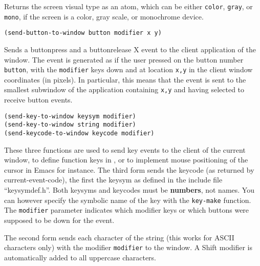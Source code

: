 

Returns the screen visual type as an atom, which can be either \verb"color",
\verb"gray", or \verb"mono", if the screen is a color, gray scale, or
monochrome device.

        
{\usagefont\begin{verbatim}
(send-button-to-window button modifier x y)
\end{verbatim}}\usageupspace

Sends a buttonpress and a buttonrelease X event to the client
application of the window. The event is generated as if the user
pressed on the button number {\tt button}, with the \verb"modifier"
keys down and at location {\tt x,y} in the client window coordinates
(in pixels). In particular, this means that the event is sent to the
smallest subwindow of the application containing {\tt x,y} and having
selected to receive button events.

        
{\usagefont\begin{verbatim}
(send-key-to-window keysym modifier)
(send-key-to-window string modifier)
(send-keycode-to-window keycode modifier)
\end{verbatim}}\usageupspace

These three functions are used to send key events to the client of the
current window, to define function keys in {\GWM}, or to implement mouse
positioning of the cursor in Emacs for instance. The third form sends the
keycode (as returned by current-event-code), the first the keysym as defined in
the include file ``keysymdef.h''. Both keysyms and keycodes must be {\bf
numbers}, not names. You can however specify the symbolic name of the key
with the \verb"key-make" function. The \verb"modifier" parameter indicates 
which
modifier keys or which buttons were supposed to be down for the event.

The second form sends each character of the string (this works for
ASCII characters only) with the modifier \verb"modifier" to the window. A
Shift modifier is automatically added to all uppercase characters.

        

